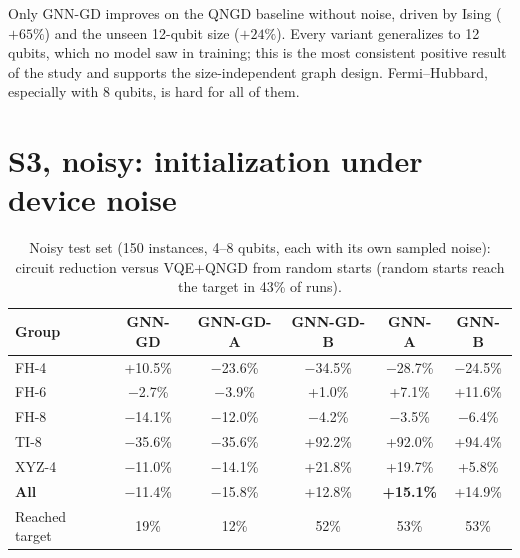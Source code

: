 \documentclass{ssnreview}
\newcommand{\Rplus}{\textcolor{green!50!black}}
\newcommand{\Rminus}{\textcolor{red!70!black}}
\begin{document}
Only GNN-GD improves on the QNGD baseline without noise, driven by Ising ($+65\%$) and the
unseen 12-qubit size ($+24\%$). Every variant generalizes to 12 qubits, which no model saw in
training; this is the most consistent positive result of the study and supports the
size-independent graph design. Fermi--Hubbard, especially with 8 qubits, is hard for all of
them.

\section{S3, noisy: initialization under device noise}

\begin{table}[H]
\centering
\caption{Noisy test set (150 instances, 4--8 qubits, each with its own sampled noise): circuit
reduction versus VQE+QNGD from random starts (random starts reach the target in 43\% of
runs).}\label{tab:noisy}
\small
\begin{tabular}{lccccc}
\toprule
Group & GNN-GD & GNN-GD-A & GNN-GD-B & GNN-A & GNN-B \\
\midrule
FH-4  & \Rplus{+10.5\%} & \Rminus{$-$23.6\%} & \Rminus{$-$34.5\%} & \Rminus{$-$28.7\%} & \Rminus{$-$24.5\%} \\
FH-6  & \Rminus{$-$2.7\%} & \Rminus{$-$3.9\%} & \Rplus{+1.0\%} & \Rplus{+7.1\%} & \Rplus{+11.6\%} \\
FH-8  & \Rminus{$-$14.1\%} & \Rminus{$-$12.0\%} & \Rminus{$-$4.2\%} & \Rminus{$-$3.5\%} & \Rminus{$-$6.4\%} \\
TI-8  & \Rminus{$-$35.6\%} & \Rminus{$-$35.6\%} & \Rplus{+92.2\%} & \Rplus{+92.0\%} & \Rplus{+94.4\%} \\
XYZ-4 & \Rminus{$-$11.0\%} & \Rminus{$-$14.1\%} & \Rplus{+21.8\%} & \Rplus{+19.7\%} & \Rplus{+5.8\%} \\
\midrule
\textbf{All} & \Rminus{$-$11.4\%} & \Rminus{$-$15.8\%} & \Rplus{+12.8\%} & \textbf{\Rplus{+15.1\%}} & \Rplus{+14.9\%} \\
Reached target & 19\% & 12\% & 52\% & 53\% & 53\% \\
\bottomrule
\end{tabular}
\end{table}
\end{document}

